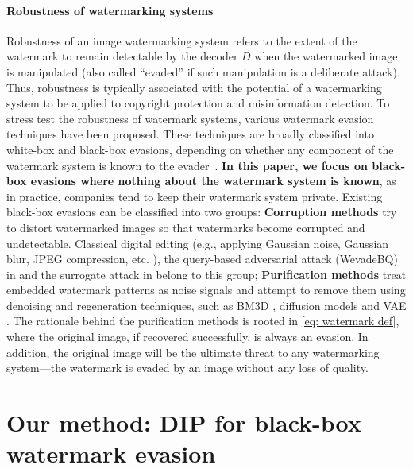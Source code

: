 \paragraph{Robustness of watermarking systems}
Robustness of an image watermarking system refers to the extent of the watermark to remain detectable by the decoder $D$ when the watermarked image is manipulated (also called ``evaded'' if such manipulation is a deliberate attack). Thus, robustness is typically associated with the potential of a watermarking system to be applied to copyright protection and misinformation detection. To stress test the robustness of watermark systems, various watermark evasion techniques have been proposed. These techniques are broadly classified into white-box and black-box evasions, depending on whether any component of the watermark system is known to the evader~\citep{an2024benchmarking}. \textbf{In this paper, we focus on black-box evasions where nothing about the watermark system is known}, as in practice, companies tend to keep their watermark system private. Existing black-box evasions can be classified into two groups: \textbf{Corruption methods} try to distort watermarked images so that watermarks become corrupted and undetectable. Classical digital editing (e.g., applying Gaussian noise, Gaussian blur, JPEG compression, etc. \citep{voyatzis1999protecting}), the query-based adversarial attack (WevadeBQ) in \cite{jiang2023evading} and the surrogate attack in \cite{saberi2023robustness} belong to this group; \textbf{Purification methods} treat embedded watermark patterns as noise signals and attempt to remove them using denoising and regeneration techniques, such as BM3D \citep{dabov2007image}, diffusion models \citep{saberi2023robustness,zhao2023invisible} and VAE \citep{zhao2023invisible}. The rationale behind the purification methods is rooted in \cref{eq: watermark def}, where the original image, if recovered successfully, is always an evasion. In addition, the original image will be the ultimate threat to any watermarking system---the watermark is evaded by an image without any loss of quality.


\section{Our method: DIP for black-box watermark evasion}
\label{Sec: methods}


